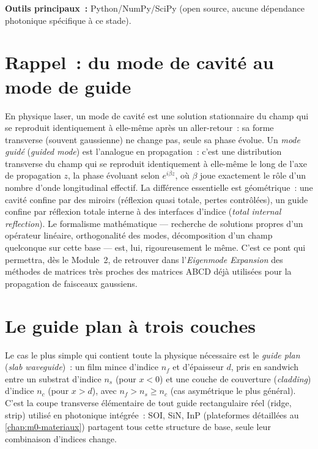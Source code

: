 \noindent\textbf{Outils principaux~:} Python/NumPy/SciPy (open source, aucune dépendance photonique spécifique à ce stade).

\section{Rappel~: du mode de cavité au mode de guide}

\begin{rappel}
En physique laser, un mode de cavité est une solution stationnaire du champ
qui se reproduit identiquement à elle-même après un aller-retour~: sa forme
transverse (souvent gaussienne) ne change pas, seule sa phase évolue. Un
\emph{mode guidé} (\emph{guided mode}) est l'analogue en propagation~: c'est
une distribution transverse du champ qui se reproduit identiquement à
elle-même le long de l'axe de propagation $z$, la phase évoluant selon
$e^{i\beta z}$, où $\beta$ joue exactement le rôle d'un nombre d'onde
longitudinal effectif. La différence essentielle est géométrique~: une
cavité confine par des miroirs (réflexion quasi totale, pertes contrôlées),
un guide confine par réflexion totale interne à des interfaces d'indice
(\emph{total internal reflection}). Le formalisme mathématique — recherche
de solutions propres d'un opérateur linéaire, orthogonalité des modes,
décomposition d'un champ quelconque sur cette base — est, lui, rigoureusement
le même. C'est ce pont qui permettra, dès le Module~2, de retrouver dans
l'\emph{Eigenmode Expansion} des méthodes de matrices très proches des
matrices ABCD déjà utilisées pour la propagation de faisceaux gaussiens.
\end{rappel}

\section{Le guide plan à trois couches}

Le cas le plus simple qui contient toute la physique nécessaire est le
\emph{guide plan} (\emph{slab waveguide})~: un film mince d'indice $n_f$ et
d'épaisseur $d$, pris en sandwich entre un substrat d'indice $n_s$ (pour
$x<0$) et une couche de couverture (\emph{cladding}) d'indice $n_c$ (pour
$x>d$), avec $n_f > n_s \geq n_c$ (cas asymétrique le plus général). C'est
la coupe transverse élémentaire de tout guide rectangulaire réel (ridge,
strip) utilisé en photonique intégrée~: SOI, SiN, InP (plateformes
détaillées au \cref{chap:m0-materiaux}) partagent tous cette structure de
base, seule leur combinaison d'indices change.


